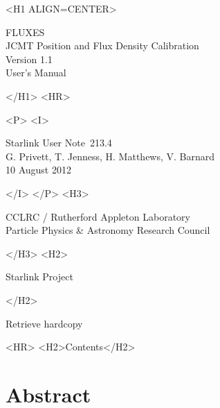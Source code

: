 \documentclass[11pt,twoside]{article}
\newcommand{\stardoccategory}  {Starlink User Note}
\newcommand{\stardocsource}    {sun213.4}
\newcommand{\stardocnumber}    {213.4}
\newcommand{\stardocauthors}   {G. Privett, T. Jenness, H. Matthews, V. Barnard}
\newcommand{\stardocdate}      {10 August 2012}
\newcommand{\stardoctitle}     {FLUXES\\[1ex]
                                JCMT Position and Flux Density Calibration}
\newcommand{\stardocversion}   {Version 1.1}
\newcommand{\stardocmanual}    {User's Manual}
\newcommand{\htmladdnormallink}[2]{#1}
\newcommand{\htmladdimg}[1]{}
\newcommand{\htmlref}[2]{#1}
\newcommand{\htmladdtonavigation}[1]{}
\newcommand{\xlabel}[1]{}
\renewcommand{\_}{\texttt{\symbol{95}}}
\begin{document}
\begin{htmlonly}
   \xlabel{}
   \begin{rawhtml} <H1 ALIGN=CENTER> \end{rawhtml}
      \stardoctitle\\
      \stardocversion\\
      \stardocmanual
   \begin{rawhtml} </H1> <HR> \end{rawhtml}


   \begin{rawhtml} <P> <I> \end{rawhtml}
   \stardoccategory\ \stardocnumber \\
   \stardocauthors \\
   \stardocdate
   \begin{rawhtml} </I> </P> <H3> \end{rawhtml}
      \htmladdnormallink{CCLRC}{http://www.cclrc.ac.uk} /
      \htmladdnormallink{Rutherford Appleton Laboratory}
                        {http://www.cclrc.ac.uk/ral} \\
      \htmladdnormallink{Particle Physics \& Astronomy Research Council}
                        {http://www.pparc.ac.uk} \\
   \begin{rawhtml} </H3> <H2> \end{rawhtml}
      \htmladdnormallink{Starlink Project}{http://www.starlink.ac.uk/}
   \begin{rawhtml} </H2> \end{rawhtml}
   \htmladdnormallink{\htmladdimg{source.gif} Retrieve hardcopy}
      {http://www.starlink.ac.uk/cgi-bin/hcserver?\stardocsource}\\

  \label{stardoccontents}
  \begin{rawhtml}
    <HR>
    <H2>Contents</H2>
  \end{rawhtml}
  \htmladdtonavigation{\htmlref{\htmladdimg{contents_motif.gif}}
        {stardoccontents}}

  \section{\xlabel{abstract}Abstract}
\end{htmlonly}
\end{document}
